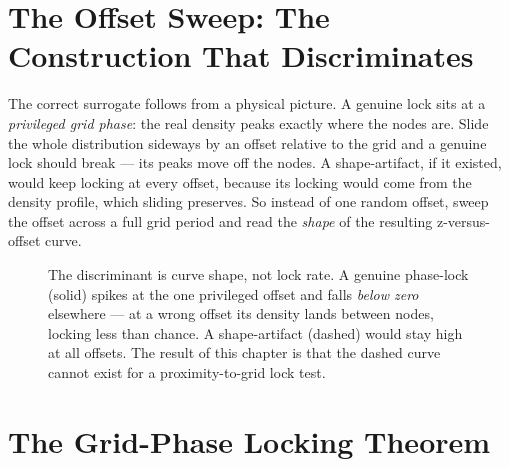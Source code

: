 \documentclass[11pt, letterpaper, openany]{book}
\begin{document}
\section{The Offset Sweep: The Construction That Discriminates}
 
The correct surrogate follows from a physical picture. A genuine lock sits at a
\emph{privileged grid phase}: the real density peaks exactly where the nodes are. Slide the
whole distribution sideways by an offset relative to the grid and a genuine lock should
break --- its peaks move off the nodes. A shape-artifact, if it existed, would keep locking
at every offset, because its locking would come from the density profile, which sliding
preserves. So instead of one random offset, sweep the offset across a full grid period and
read the \emph{shape} of the resulting z-versus-offset curve.
 
\begin{figure}[H]
\centering
{}
\caption{The discriminant is curve shape, not lock rate. A genuine phase-lock (solid)
spikes at the one privileged offset and falls \emph{below zero} elsewhere --- at a wrong
offset its density lands between nodes, locking less than chance. A shape-artifact (dashed)
would stay high at all offsets. The result of this chapter is that the dashed curve cannot
exist for a proximity-to-grid lock test.}
\label{fig:nl_sweep}
\end{figure}
 
\section{The Grid-Phase Locking Theorem}
 
\end{document}

